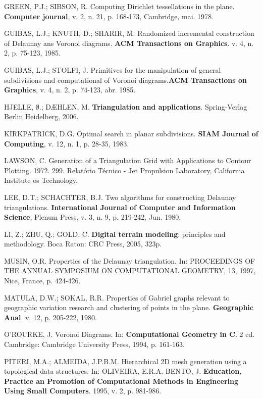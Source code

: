 \documentclass[12pt,a4paper]{book}
\begin{document}
\begin{thebibliography}{99}
 GREEN, P.J.; SIBSON, R. Computing Dirichlet tessellations in the plane. {\bf Computer journal}, v. 2, n. 21, p. 168-173, Cambridge, mai. 1978.

 GUIBAS, L.J.; KNUTH, D.; SHARIR, M. Randomized incremental construction of Delaunay ans Voronoi diagrams. {\bf ACM Transactions on Graphics}. v. 4, n. 2, p. 75-123, 1985.

 GUIBAS, L.J.; STOLFI, J. Primitives for the manipulation
of general subdivisions and computational of Voronoi diagrams.{\bf ACM
Transactions on Graphics}, v. 4, n. 2, p. 74-123, abr. 1985.

 HJELLE, $\emptyset$.; D\AE{}HLEN, M. {\bf Triangulation and applications}. Spring-Verlag Berlin Heidelberg, 2006.

 KIRKPATRICK, D.G. Optimal search in planar subdivisions. {\bf SIAM Journal of Computing}, v. 12, n. 1, p. 28-35, 1983.

 LAWSON, C. Generation of a Triangulation Grid with
Applications to Contour Plotting. 1972. 299. Relat\'orio T\'ecnico - Jet Propulsion Laboratory, California Institute os Technology.

 LEE, D.T.; SCHACHTER, B.J. Two algorithms for constructing
Delaunay triangulations. {\bf International Journal of Computer and Information Science}, Plenum Press, v. 3, n. 9, p. 219-242, Jun. 1980.

 LI, Z.; ZHU, Q.; GOLD, C. {\bf Digital terrain modeling}: principles and methodology. Boca Raton: CRC Press, 2005, 323p.

 MUSIN, O.R. Properties of the Delaunay triangulation. In: PROCEEDINGS OF THE ANNUAL SYMPOSIUM ON COMPUTATIONAL GEOMETRY, 13, 1997, Nice, France, p. 424-426.

 MATULA, D.W.; SOKAL, R.R. Properties of Gabriel graphs relevant to geographic variation research and clustering of points in the plane. {\bf Geographic Anal}. v. 12, p. 205-222, 1980. 

 O'ROURKE, J. Voronoi Diagrams. In: {\bf Computational Geometry in C}. 2 ed. Cambridge: Cambridge University Press, 1994, p. 161-163.

 PITERI, M.A.; ALMEIDA, J.P.B.M. Hierarchical 2D
mesh generation using a topological data structures. In: OLIVEIRA, E.R.A. BENTO, J. {\bf Education, Practice an Promotion of Computational Methods in Engineering Using Small Computers}. 1995, v. 2, p. 981-986.


\end{thebibliography}
\end{document}
